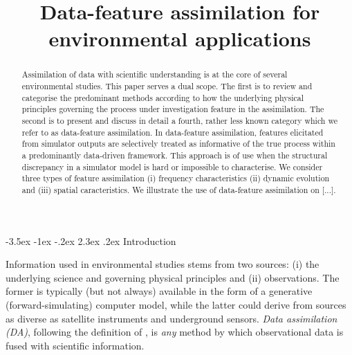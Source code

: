 \documentclass[10pt,a4paper]{article}
\title{Data-feature assimilation for environmental applications}
\makeatletter
\renewcommand\section{\@startsection{section}{1}{\z@}%
                                  {-3.5ex \@plus -1ex \@minus -.2ex}%
                                  {2.3ex \@plus.2ex}%
                                  {\normalfont\large\bfseries}}
\makeatother
\begin{document}
\maketitle

\begin{abstract}
Assimilation of data with scientific understanding is at the core of several environmental studies. This paper serves a dual scope. The first is to review and categorise the predominant methods according to how the underlying physical principles governing the process under investigation feature in the assimilation. The second is to present and discuss in detail a fourth, rather less known category which we refer to as data-feature assimilation. In data-feature assimilation, features elicitated from simulator outputs are selectively treated as informative of the true process within a predominantly data-driven framework. This approach is of use when the structural discrepancy in a simulator model is hard or impossible to characterise. We consider three types of feature assimilation (i) frequency characteristics (ii) dynamic evolution and (iii) spatial caracteristics. We illustrate the use of data-feature assimilation on [...]. %
\end{abstract}


\section{Introduction}

Information used in environmental studies stems from two sources: (i) the underlying science and governing physical principles and (ii) observations. The former is typically (but not always) available in the form of a generative (forward-simulating) computer model, while the latter could derive from sources as diverse as satellite instruments and underground sensors.  \emph{Data assimilation (DA)}, following the definition of \cite{Wikle_2007}, is \emph{any} method by which observational data is fused with scientific information. 
\end{document}
